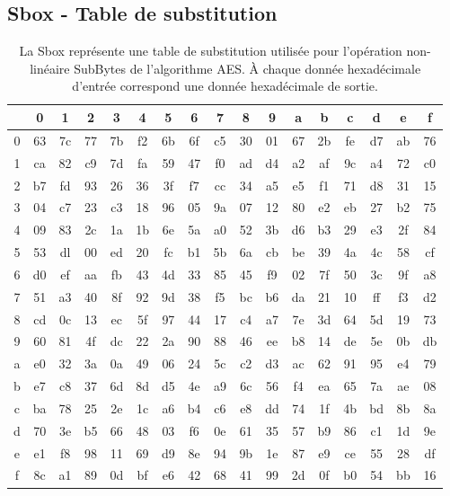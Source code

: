 \documentclass[oneside]{book}
\begin{document}
\begin{appendices}
\section{Sbox - Table de substitution}
\label{ann:Sbox}
\begin{table}[htbp]
	\centering
	\begin{tabular}{|c||c|c|c|c|c|c|c|c|c|c|c|c|c|c|c|c|}
		  \hline
		  & 0 & 1 & 2 & 3 & 4 & 5 & 6 & 7 & 8 & 9 & a & b & c & d & e & f \\ \hline \hline
		  0 & 63 & 7c & 77 & 7b & f2 & 6b & 6f & c5 & 30 & 01 & 67 & 2b & fe & d7 & ab & 76   \\ \hline	
		  1 & ca & 82 & c9 & 7d & fa & 59 & 47 & f0 & ad & d4 & a2 & af & 9c & a4 & 72 & c0   \\ \hline	
		  2 & b7 & fd & 93 & 26 & 36 & 3f & f7 & cc & 34 & a5 & e5 & f1 & 71 & d8 & 31 & 15   \\ \hline	
		  3 & 04 & c7 & 23 & c3 & 18 & 96 & 05 & 9a & 07 & 12 & 80 & e2 & eb & 27 & b2 & 75   \\ \hline	
		  4 & 09 & 83 & 2c & 1a & 1b & 6e & 5a & a0 & 52 & 3b & d6 & b3 & 29 & e3 & 2f & 84   \\ \hline	
		  5 & 53 & dl & 00 & ed & 20 & fc & b1 & 5b & 6a & cb & be & 39 & 4a & 4c & 58 & cf   \\ \hline	
		  6 & d0 & ef & aa & fb & 43 & 4d & 33 & 85 & 45 & f9 & 02 & 7f & 50 & 3c & 9f & a8   \\ \hline	
		  7 & 51 & a3 & 40 & 8f & 92 & 9d & 38 & f5 & bc & b6 & da & 21 & 10 & ff & f3 & d2   \\ \hline	
		  8 & cd & 0c & 13 & ec & 5f & 97 & 44 & 17 & c4 & a7 & 7e & 3d & 64 & 5d & 19 & 73   \\ \hline	
		  9 & 60 & 81 & 4f & dc & 22 & 2a & 90 & 88 & 46 & ee & b8 & 14 & de & 5e & 0b & db   \\ \hline	
		  a & e0 & 32 & 3a & 0a & 49 & 06 & 24 & 5c & c2 & d3 & ac & 62 & 91 & 95 & e4 & 79   \\ \hline	
		  b & e7 & c8 & 37 & 6d & 8d & d5 & 4e & a9 & 6c & 56 & f4 & ea & 65 & 7a & ae & 08   \\ \hline	
		  c & ba & 78 & 25 & 2e & 1c & a6 & b4 & c6 & e8 & dd & 74 & 1f & 4b & bd & 8b & 8a   \\ \hline	
		  d & 70 & 3e & b5 & 66 & 48 & 03 & f6 & 0e & 61 & 35 & 57 & b9 & 86 & c1 & 1d & 9e   \\ \hline	
		  e & e1 & f8 & 98 & 11 & 69 & d9 & 8e & 94 & 9b & 1e & 87 & e9 & ce & 55 & 28 & df   \\ \hline	
		  f & 8c & a1 & 89 & 0d & bf & e6 & 42 & 68 & 41 & 99 & 2d & 0f & b0 & 54 & bb & 16   \\ \hline	
	\end{tabular}
 	\caption{La Sbox représente une table de substitution utilisée pour l'opération non-linéaire SubBytes de l'algorithme AES. À chaque donnée hexadécimale d'entrée correspond une donnée hexadécimale de sortie.}
 	\label{fig:Sbox}
\end{table}


\end{appendices}
\end{document}
